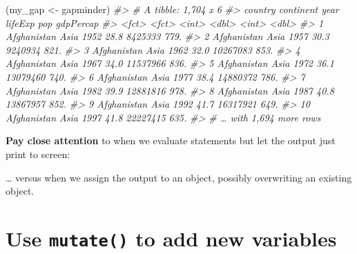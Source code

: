 \documentclass[
]{book}
\newenvironment{Shaded}{\begin{snugshade}}{\end{snugshade}}
\newcommand{\CommentTok}[1]{\textcolor[rgb]{0.56,0.35,0.01}{\textit{#1}}}
\newcommand{\KeywordTok}[1]{\textcolor[rgb]{0.13,0.29,0.53}{\textbf{#1}}}
\newcommand{\NormalTok}[1]{#1}
\newcommand{\OperatorTok}[1]{\textcolor[rgb]{0.81,0.36,0.00}{\textbf{#1}}}
\newcommand{\StringTok}[1]{\textcolor[rgb]{0.31,0.60,0.02}{#1}}
\begin{document}
\begin{Shaded}
\begin{Highlighting}[]
\NormalTok{(my_gap <-}\StringTok{ }\NormalTok{gapminder)}
\CommentTok{#> # A tibble: 1,704 x 6}
\CommentTok{#>    country     continent  year lifeExp      pop gdpPercap}
\CommentTok{#>    <fct>       <fct>     <int>   <dbl>    <int>     <dbl>}
\CommentTok{#>  1 Afghanistan Asia       1952    28.8  8425333      779.}
\CommentTok{#>  2 Afghanistan Asia       1957    30.3  9240934      821.}
\CommentTok{#>  3 Afghanistan Asia       1962    32.0 10267083      853.}
\CommentTok{#>  4 Afghanistan Asia       1967    34.0 11537966      836.}
\CommentTok{#>  5 Afghanistan Asia       1972    36.1 13079460      740.}
\CommentTok{#>  6 Afghanistan Asia       1977    38.4 14880372      786.}
\CommentTok{#>  7 Afghanistan Asia       1982    39.9 12881816      978.}
\CommentTok{#>  8 Afghanistan Asia       1987    40.8 13867957      852.}
\CommentTok{#>  9 Afghanistan Asia       1992    41.7 16317921      649.}
\CommentTok{#> 10 Afghanistan Asia       1997    41.8 22227415      635.}
\CommentTok{#> # … with 1,694 more rows}
\end{Highlighting}
\end{Shaded}

\textbf{Pay close attention} to when we evaluate statements but let the output just print to screen:

\begin{Shaded}
\end{Shaded}

\ldots{} versus when we assign the output to an object, possibly overwriting an existing object.

\begin{Shaded}
\end{Shaded}

\hypertarget{use-mutate-to-add-new-variables}{%
\section{\texorpdfstring{Use \texttt{mutate()} to add new variables}{Use mutate() to add new variables}}\label{use-mutate-to-add-new-variables}}
\end{document}
